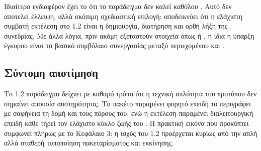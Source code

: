 Ιδιαίτερο ενδιαφέρον έχει το ότι το παράδειγμα δεν καλεί καθόλου . Αυτό δεν αποτελεί έλλειψη, αλλά σκόπιμη σχεδιαστική επιλογή: αποδεικνύει ότι η ελάχιστη συμβατή εκτέλεση στο  1.2 είναι η δημιουργία, διατήρηση και ορθή λήξη της συνεδρίας. Με άλλα λόγια, πριν ακόμη εξεταστούν στοιχεία όπως  ή , η ίδια η ύπαρξη έγκυρου  είναι το βασικό συμβόλαιο συνεργασίας μεταξύ περιεχομένου και .

\subsection{Σύντομη αποτίμηση}
\label{subsec:scorm12_summary}

Το  1.2 παράδειγμα δείχνει με καθαρό τρόπο ότι η τεχνική απλότητα του προτύπου δεν σημαίνει απουσία αυστηρότητας. Το πακέτο παραμένει φορητό επειδή το  περιγράφει με σαφήνεια τη δομή και τους πόρους του, ενώ η εκτέλεση παραμένει διαλειτουργική επειδή κάθε  τηρεί τον ελάχιστο κύκλο ζωής του . Η πρακτική εικόνα που προκύπτει συμφωνεί πλήρως με το Κεφάλαιο 3: η ισχύς του  1.2 προέρχεται κυρίως από την απλή αλλά σταθερή τυποποίηση πακεταρίσματος και εκκίνησης.
